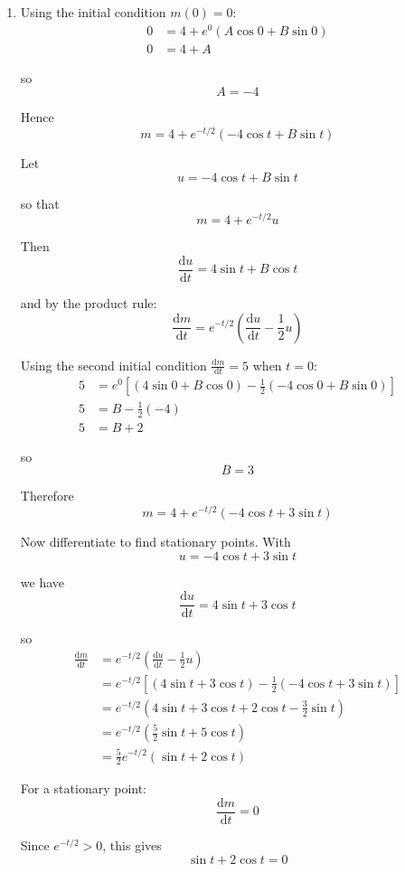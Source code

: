 \documentclass[leqno]{article}
\begin{document}
\begin{enumerate}[
  label=\textbf{\arabic*.},
  leftmargin=*,
  topsep=0pt,
  partopsep=0pt,
  parsep=0pt
]
\begin{djsSolution}
\begin{enumerate}[label=\textbf{(\alph*)}]
  \item Using the initial condition \(m(0)=0\):
  \begin{align*}
  0&=4+e^{0}(A\cos 0+B\sin 0)\\
  0&=4+A
  \end{align*}

  so
  \[
  A=-4
  \]

  Hence
  \[
  m=4+e^{-t/2}(-4\cos t+B\sin t)
  \]

  Let
  \[
  u=-4\cos t+B\sin t
  \]

  so that
  \[
  m=4+e^{-t/2}u
  \]

  Then
  \[
  \frac{\mathrm{d}u}{\mathrm{d}t}=4\sin t+B\cos t
  \]

  and by the product rule:
  \[
  \frac{\mathrm{d}m}{\mathrm{d}t}=e^{-t/2}\left(\frac{\mathrm{d}u}{\mathrm{d}t}-\frac12u\right)
  \]

  Using the second initial condition \(\frac{\mathrm{d}m}{\mathrm{d}t}=5\) when \(t=0\):
  \begin{align*}
  5&=e^{0}\left[\left(4\sin 0+B\cos 0\right)-\frac12\left(-4\cos 0+B\sin 0\right)\right]\\
  5&=B-\frac12(-4)\\
  5&=B+2
  \end{align*}

  so
  \[
  B=3
  \]

  Therefore
  \[
  m=4+e^{-t/2}(-4\cos t+3\sin t)
  \]

  Now differentiate to find stationary points. With
  \[
  u=-4\cos t+3\sin t
  \]

  we have
  \[
  \frac{\mathrm{d}u}{\mathrm{d}t}=4\sin t+3\cos t
  \]

  so
  \begin{align*}
  \frac{\mathrm{d}m}{\mathrm{d}t}
  &=e^{-t/2}\left(\frac{\mathrm{d}u}{\mathrm{d}t}-\frac12u\right)\\
  &=e^{-t/2}\left[(4\sin t+3\cos t)-\frac12(-4\cos t+3\sin t)\right]\\
  &=e^{-t/2}\left(4\sin t+3\cos t+2\cos t-\frac32\sin t\right)\\
  &=e^{-t/2}\left(\frac52\sin t+5\cos t\right)\\
  &=\frac52e^{-t/2}(\sin t+2\cos t)
  \end{align*}

  For a stationary point:
  \[
  \frac{\mathrm{d}m}{\mathrm{d}t}=0
  \]

  Since \(e^{-t/2}>0\), this gives
  \[
  \sin t+2\cos t=0
  \]


\end{enumerate}
\end{djsSolution}
\end{enumerate}
\end{document}
